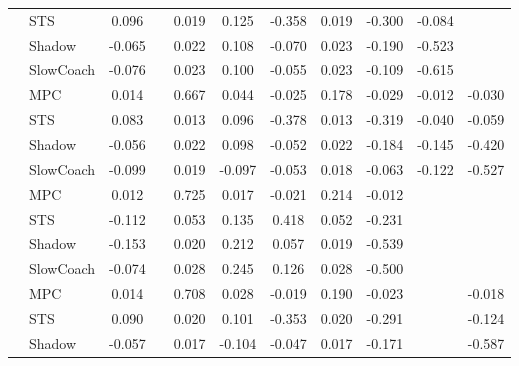 \begin{tabular}{|l|l|*{9}{c|}}
                                                           & STS &    0.096 &        &     0.019 &  0.125 & -0.358 &  0.019 &  -0.300 &  -0.084 &       \\
                                                           & Shadow &   -0.065 &        &     0.022 &  0.108 & -0.070 &  0.023 &  -0.190 &  -0.523 &       \\
                                                           & SlowCoach &   -0.076 &        &     0.023 &  0.100 & -0.055 &  0.023 &  -0.109 &  -0.615 &       \\
\midrule
[True, False, True, True, True, True, True, True, True] & MPC &    0.014 &        &     0.667 &  0.044 & -0.025 &  0.178 &  -0.029 &  -0.012 &   -0.030 \\
                                                           & STS &    0.083 &        &     0.013 &  0.096 & -0.378 &  0.013 &  -0.319 &  -0.040 &   -0.059 \\
                                                           & Shadow &   -0.056 &        &     0.022 &  0.098 & -0.052 &  0.022 &  -0.184 &  -0.145 &   -0.420 \\
                                                           & SlowCoach &   -0.099 &        &     0.019 & -0.097 & -0.053 &  0.018 &  -0.063 &  -0.122 &   -0.527 \\
\midrule
[True, False, True, True, True, True, True, False, False] & MPC &    0.012 &        &     0.725 &  0.017 & -0.021 &  0.214 &  -0.012 &      &       \\
                                                           & STS &   -0.112 &        &     0.053 &  0.135 &  0.418 &  0.052 &  -0.231 &      &       \\
                                                           & Shadow &   -0.153 &        &     0.020 &  0.212 &  0.057 &  0.019 &  -0.539 &      &       \\
                                                           & SlowCoach &   -0.074 &        &     0.028 &  0.245 &  0.126 &  0.028 &  -0.500 &      &       \\
\midrule
[True, False, True, True, True, True, True, False, True] & MPC &    0.014 &        &     0.708 &  0.028 & -0.019 &  0.190 &  -0.023 &      &   -0.018 \\
                                                           & STS &    0.090 &        &     0.020 &  0.101 & -0.353 &  0.020 &  -0.291 &      &   -0.124 \\
                                                           & Shadow &   -0.057 &        &     0.017 & -0.104 & -0.047 &  0.017 &  -0.171 &      &   -0.587 \\

\end{tabular}
